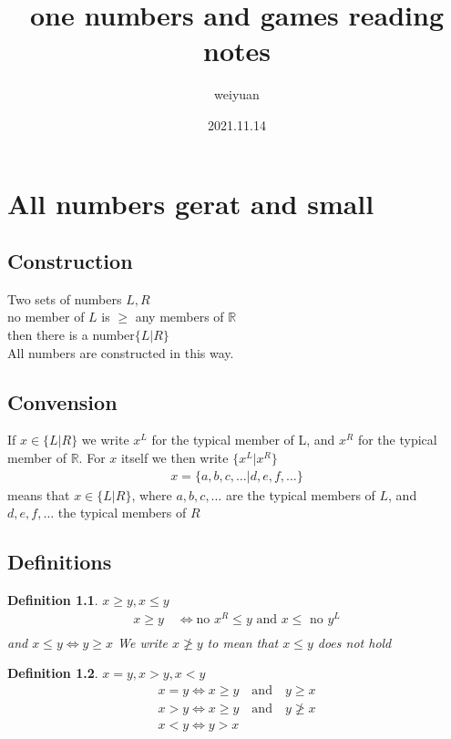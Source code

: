 \documentclass[10pt,a4paper]{book}
\title{one numbers and games reading notes}
\author{weiyuan}
\date{2021.11.14}
\newtheorem{myDef}{Definition}
\begin{document}
	\maketitle
\chapter{All numbers gerat and small}
\sffamily
\section{Construction}

Two sets of numbers $  L,R  $\\
no member of $ L $ is $ \ge  $ any members of $ \mathbb{R} $\\
then there is a number$ \{L|R\} $\\
All numbers are constructed in this way.\\

\section{Convension}

If $ x\in\{L|R\} $ we write $ x^L $ for the typical member of L, and $ x^R $ for the typical member of $ \mathbb{R} $. For $ x $ itself we then write $ \{x^L|x^R\} $ 
\begin{gather}
	x = \{ a,b,c,\dots | d,e,f,\dots \}
\end{gather}
means that $ x\in \{L|R\} $, where $ a,b,c,\dots $ are the typical members of $ L $, and $ d,e,f,\dots $ the typical members of $ R $\\

\section{Definitions}
\begin{myDef}
	$ x \ge y, x \le y $\\
	\begin{gather*}
		x \ge y \quad \iff \text{no } x^R \le y \text{ and } x \le \text{ no } y^L\\
	\end{gather*}
	and $ x\le y \iff y\ge x $
	We write $ x\ngeq y $ to mean that $ x \le y $ does not hold
	
\end{myDef}

\begin{myDef}
	$ x=y, x>y, x<y $\\
	\begin{gather*}
		x = y \iff x\ge y \quad\text{and}\quad y \ge x\\
		x > y \iff x\ge y \quad\text{and}\quad y \ngeq x\\
		x < y \iff y>x\\		
	\end{gather*}
	
\end{myDef}
\end{document}

